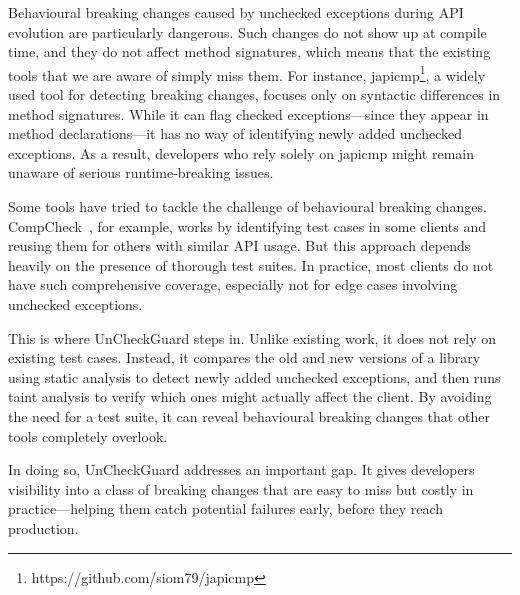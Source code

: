 Behavioural breaking changes caused by unchecked exceptions during API evolution are particularly dangerous. Such changes do not show up at compile time, and they do not affect method signatures, which means that the existing tools that we are aware of simply miss them. For instance, japicmp\footnote{https://github.com/siom79/japicmp}, a widely used tool for detecting breaking changes, focuses only on syntactic differences in method signatures. While it can flag checked exceptions—since they appear in method declarations—it has no way of identifying newly added unchecked exceptions. As a result, developers who rely solely on japicmp might remain unaware of serious runtime-breaking issues.

Some tools have tried to tackle the challenge of behavioural breaking changes. CompCheck~\cite{CompCheck}, for example, works by identifying test cases in some clients and reusing them for others with similar API usage. But this approach depends heavily on the presence of thorough test suites. In practice, most clients do not have such comprehensive coverage, especially not for edge cases involving unchecked exceptions.

This is where UnCheckGuard steps in. Unlike existing work, it does not rely on existing test cases. Instead, it compares the old and new versions of a library using static analysis to detect newly added unchecked exceptions, and then runs taint analysis to verify which ones might actually affect the client. By avoiding the need for a test suite, it can reveal behavioural breaking changes that other tools completely overlook.

In doing so, UnCheckGuard addresses an important gap. It gives developers visibility into a class of breaking changes that are easy to miss but costly in practice—helping them catch potential failures early, before they reach production.
